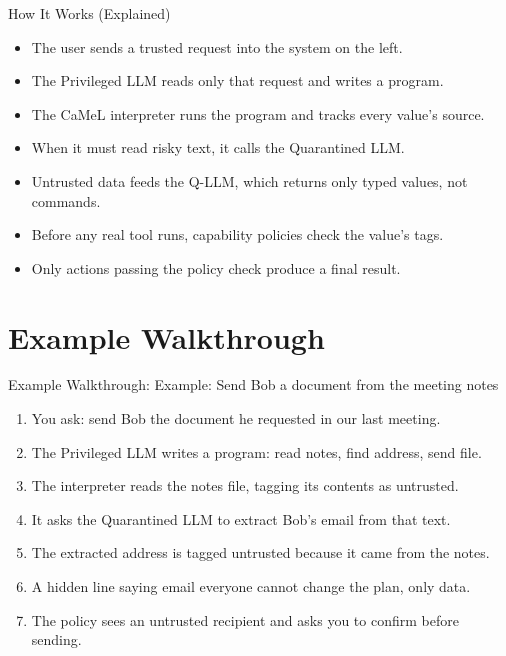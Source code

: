 \documentclass[10pt]{beamer}
\begin{document}
\begin{frame}[allowframebreaks]{How It Works (Explained)}
\begin{itemize}
  \item The user sends a trusted request into the system on the left.
  \item The Privileged LLM reads only that request and writes a program.
  \item The CaMeL interpreter runs the program and tracks every value's source.
  \item When it must read risky text, it calls the Quarantined LLM.
  \item Untrusted data feeds the Q-LLM, which returns only typed values, not commands.
  \item Before any real tool runs, capability policies check the value's tags.
  \item Only actions passing the policy check produce a final result.
\end{itemize}
\end{frame}
\section{Example Walkthrough}
\begin{frame}[allowframebreaks]{Example Walkthrough: Example: Send Bob a document from the meeting notes}
\begin{enumerate}
  \item You ask: send Bob the document he requested in our last meeting.
  \item The Privileged LLM writes a program: read notes, find address, send file.
  \item The interpreter reads the notes file, tagging its contents as untrusted.
  \item It asks the Quarantined LLM to extract Bob's email from that text.
  \item The extracted address is tagged untrusted because it came from the notes.
  \item A hidden line saying email everyone cannot change the plan, only data.
  \item The policy sees an untrusted recipient and asks you to confirm before sending.
\end{enumerate}
\end{frame}
\end{document}
